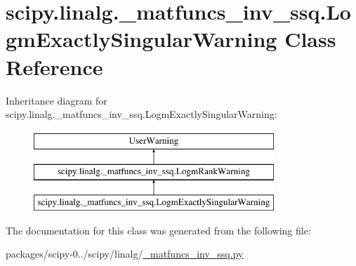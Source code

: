 \hypertarget{classscipy_1_1linalg_1_1__matfuncs__inv__ssq_1_1LogmExactlySingularWarning}{}\section{scipy.\+linalg.\+\_\+matfuncs\+\_\+inv\+\_\+ssq.\+Logm\+Exactly\+Singular\+Warning Class Reference}
\label{classscipy_1_1linalg_1_1__matfuncs__inv__ssq_1_1LogmExactlySingularWarning}
Inheritance diagram for scipy.\+linalg.\+\_\+matfuncs\+\_\+inv\+\_\+ssq.\+Logm\+Exactly\+Singular\+Warning\+:\begin{figure}[H]
\begin{center}
\leavevmode
\includegraphics[height=3.000000cm]{classscipy_1_1linalg_1_1__matfuncs__inv__ssq_1_1LogmExactlySingularWarning}
\end{center}
\end{figure}


The documentation for this class was generated from the following file\+:\begin{DoxyCompactItemize}
\item 
packages/scipy-\/0../scipy/linalg/\hyperlink{__matfuncs__inv__ssq_8py}{\+\_\+matfuncs\+\_\+inv\+\_\+ssq.\+py}\end{DoxyCompactItemize}

